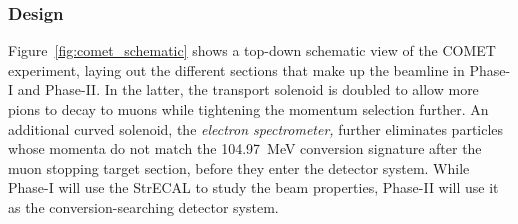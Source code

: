 \subsubsection{Design}
Figure~\ref{fig:comet_schematic} shows a top-down schematic view of the COMET
experiment, laying out the different sections that make up the beamline in
Phase-I and Phase-II. In the latter, the transport solenoid is doubled to allow
more pions to decay to muons while tightening the momentum selection further. An
additional curved solenoid, the \emph{electron spectrometer,} further eliminates
particles whose momenta do not match the \SI{104.97}{\MeV} conversion signature
after the muon stopping target section, before they enter the detector system.
While Phase-I will use the StrECAL to study the beam properties, Phase-II will
use it as the conversion-searching detector system.

